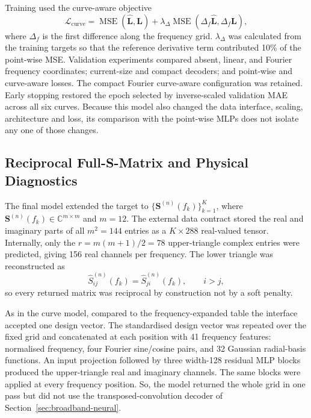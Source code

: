 Training used the curve-aware objective
\begin{equation}
    \mathcal{L}_{\mathrm{curve}}=
    \operatorname{MSE}(\widehat{\mathbf{L}},\mathbf{L})+
    \lambda_{\Delta}\operatorname{MSE}
    (\Delta_f\widehat{\mathbf{L}},\Delta_f\mathbf{L}),
    \label{eq:curve-loss}
\end{equation}
where $\Delta_f$ is the first difference along the frequency grid. $\lambda_{\Delta}$
was calculated from the training targets so that the reference derivative term
contributed 10\% of the point-wise MSE. Validation experiments compared absent, linear,
and Fourier frequency coordinates; current-size and compact decoders; and point-wise and
curve-aware losses. The compact Fourier curve-aware configuration was retained. Early
stopping restored the epoch selected by inverse-scaled validation MAE across all six
curves. Because this model also changed the data interface, scaling, architecture and
loss, its comparison with the point-wise MLPs does not isolate any one of those changes.

\subsection{Reciprocal Full-S-Matrix and Physical Diagnostics}
\label{sec:full-smatrix}
The final model extended the target to $\{\mathbf{S}^{(n)}(f_k)\}_{k=1}^{K}$, where
$\mathbf{S}^{(n)}(f_k)\in\mathbb{C}^{m\times m}$ and $m=12$. The external data contract
stored the real and imaginary parts of all $m^2=144$ entries as a $K\times288$
real-valued tensor. Internally, only the $r=m(m+1)/2=78$ upper-triangle complex entries
were predicted, giving 156 real channels per frequency. The lower triangle was
reconstructed as
\begin{equation}
    \widehat{S}_{ij}^{(n)}(f_k)
    =\widehat{S}_{ji}^{(n)}(f_k),\qquad i>j,
    \label{eq:reciprocal-reconstruction}
\end{equation}
so every returned matrix was reciprocal by construction not by a soft penalty.

As in the curve model, compared to the frequency-expanded table the interface accepted
one design vector. The standardised design vector was repeated over the fixed grid and
concatenated at each position with 41 frequency features: normalised frequency, four
Fourier sine/cosine pairs, and 32 Gaussian radial-basis functions. An input projection
followed by three width-128 residual MLP blocks produced the upper-triangle real and
imaginary channels. The same blocks were applied at every frequency position. So, the
model returned the whole grid in one pass but did not use the transposed-convolution
decoder of Section~\ref{sec:broadband-neural}.

